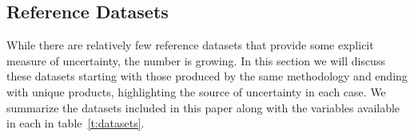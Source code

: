 \documentclass{agujournal}
\begin{document}
\subsection{Reference Datasets}\label{sec:data}

While there are relatively few reference datasets that provide some explicit measure of uncertainty, the number is growing. In this section we will discuss these datasets starting with those produced by the same methodology and ending with unique products, highlighting the source of uncertainty in each case. We summarize the datasets included in this paper along with the variables available in each in table~\ref{t:datasets}.
\newcommand{\classvars}{
	precipitation ($\mathit{pr}$),
	evapotranspiration/latent heat ($\mathit{evspsbl}$/$\mathit{hfls}$),
	runoff ($\mathit{mrro}$),
	sensible heat ($\mathit{hfss}$),
	surface net radiation ($\mathit{rns}$)
}
\newcommand{\cardvars}{
	soil carbon ($\mathit{cSoil}$),
	evapotranspiration ($\mathit{evspsbl}$),
	carbon from fire ($\mathit{fFire}$),
	gross primary productivity ($\mathit{gpp}$),
	leaf area index ($\mathit{lai}$),
	surface runoff ($\mathit{mrros}$),
	runoff ($\mathit{mrro}$),
	net biome production ($\mathit{nbp}$),
	net ecosystem exchange ($\mathit{nee}$),
	autotrophic respiration ($\mathit{ra}$),
	heterotrophic respiration ($\mathit{rh}$),
	surface snow ($\mathit{snw}$),
	transpiration ($\mathit{tran}$)
}
\newcommand{\woavars}{
	oxygen ($\mathit{o2}$),
	nitrate ($\mathit{no3}$),
	phosphate ($\mathit{po4}$),
	silicate ($\mathit{si}$),
	temperature ($\mathit{thetao}$)
}
\end{document}
